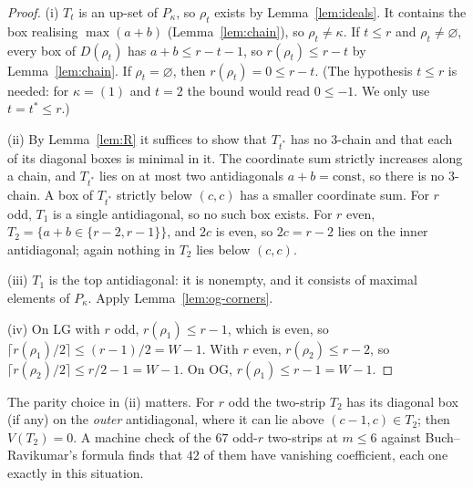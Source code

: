 \documentclass[11pt]{amsart}
\theoremstyle{definition}
\theoremstyle{remark}
\newcommand{\LG}{\mathrm{LG}}
\newcommand{\OG}{\mathrm{OG}}
\begin{document}
\begin{proof}
(i) $T_t$ is an up-set of $P_\kappa$, so $\rho_t$ exists by Lemma~\ref{lem:ideals}. It
contains the box realising $\max(a+b)$ (Lemma~\ref{lem:chain}), so $\rho_t\ne\kappa$. If
$t\le r$ and $\rho_t\ne\varnothing$, every box of $D(\rho_t)$ has $a+b\le r-t-1$, so
$r(\rho_t)\le r-t$ by Lemma~\ref{lem:chain}. If $\rho_t=\varnothing$, then $r(\rho_t)=0\le r-t$.
(The hypothesis $t\le r$ is needed: for $\kappa=(1)$ and $t=2$ the bound would read $0\le-1$.
We only use $t=t^*\le r$.)

(ii) By Lemma~\ref{lem:R} it suffices to show that $T_{t^*}$ has no
$3$-chain and that each of its diagonal boxes is minimal in it. The coordinate sum strictly
increases along a chain, and $T_{t^*}$ lies on at most two antidiagonals $a+b=\text{const}$, so
there is no $3$-chain. A box of $T_{t^*}$ strictly below $(c,c)$ has a smaller coordinate sum.
For $r$ odd, $T_1$ is a single antidiagonal, so no such box exists. For $r$ even,
$T_2=\{a+b\in\{r-2,r-1\}\}$, and $2c$ is even, so $2c=r-2$ lies on the inner antidiagonal;
again nothing in $T_2$ lies below $(c,c)$.

(iii) $T_1$ is the top antidiagonal: it is nonempty, and it consists of maximal elements of
$P_\kappa$. Apply Lemma~\ref{lem:og-corners}.

(iv) On $\LG$ with $r$ odd, $r(\rho_1)\le r-1$, which is even, so
$\lceil r(\rho_1)/2\rceil\le(r-1)/2=W-1$. With $r$ even, $r(\rho_2)\le r-2$, so
$\lceil r(\rho_2)/2\rceil\le r/2-1=W-1$. On $\OG$, $r(\rho_1)\le r-1=W-1$.
\end{proof}

The parity choice in (ii) matters. For $r$ odd the two-strip $T_2$ has its diagonal box (if
any) on the \emph{outer} antidiagonal, where it can lie above $(c-1,c)\in T_2$; then $V(T_2)=0$.
A machine check of the $67$ odd-$r$ two-strips at $m\le6$ against Buch--Ravikumar's formula
finds that $42$ of them have vanishing coefficient, each one exactly in this situation.
\end{document}
